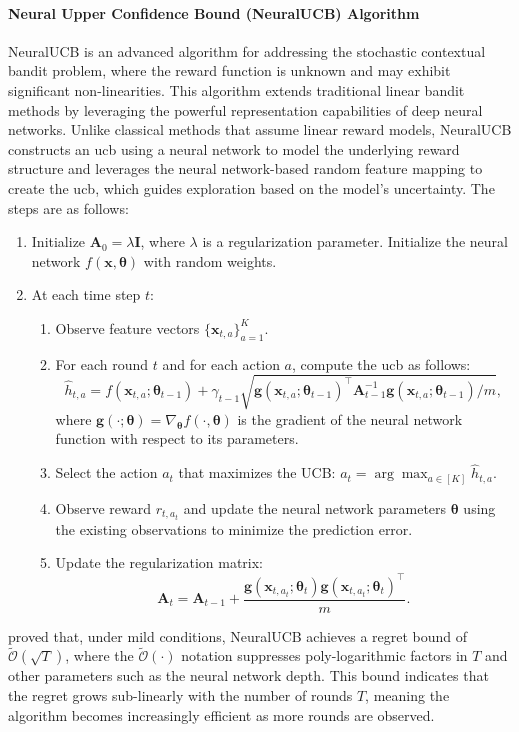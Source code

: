 \paragraph{Neural Upper Confidence Bound (NeuralUCB) Algorithm}
NeuralUCB \citep{zhou2020neural} is an advanced algorithm for addressing the stochastic contextual bandit problem, where the reward function is unknown and may exhibit significant non-linearities. This algorithm extends traditional linear bandit methods by leveraging the powerful representation capabilities of deep neural networks. Unlike classical methods that assume linear reward models, NeuralUCB constructs an \acf{ucb} using a neural network to model the underlying reward structure and leverages the neural network-based random feature mapping to create the \ac{ucb}, which guides exploration based on the model's uncertainty. The steps are as follows:
\begin{enumerate}
    \item Initialize $\mathbf{A}_0 = \lambda \mathbf{I}$, where $\lambda$ is a regularization parameter. Initialize the neural network $f (\mathbf{x}, \boldsymbol{\theta})$ with random weights. 
    \item At each time step $t$:
    \begin{enumerate}
        \item Observe feature vectors $\{\mathbf{x}_{t,a}\}_{a=1}^K$.
        \item For each round \( t \) and for each action \( a \), compute the \ac{ucb} as follows:
        \[
        \hat{h}_{t,a} = f(\mathbf{x}_{t,a}; \boldsymbol{\theta}_{t-1}) + \gamma_{t-1} \sqrt{\mathbf{g}(\mathbf{x}_{t,a}; \boldsymbol{\theta}_{t-1})^\top \mathbf{A}_{t-1}^{-1} \mathbf{g}(\mathbf{x}_{t,a}; \boldsymbol{\theta}_{t-1}) / m}, 
        \]
        where $\mathbf{g}(\cdot; \boldsymbol{\theta}) = \nabla_{\boldsymbol{\theta}} f(\cdot, \boldsymbol{\theta})$ is the gradient of the neural network function with respect to its parameters.  
        \item Select the action \( a_t \) that maximizes the UCB: $ a_t = \arg\max_{a \in [K]} \hat{h}_{t,a}.$
        \item Observe reward $r_{t, a_t}$ and update the neural network parameters $\boldsymbol{\theta}$ using the existing observations to minimize the prediction error.
        \item Update the regularization matrix:
            \[
            \mathbf{A}_t = \mathbf{A}_{t-1} + \frac{\mathbf{g}(\mathbf{x}_{t,a_t}; \boldsymbol{\theta}_t) \mathbf{g}(\mathbf{x}_{t,a_t}; \boldsymbol{\theta}_t)^\top}{m}.
            \]
    \end{enumerate}
\end{enumerate}
\citet{zhou2020neural} proved that, under mild conditions, NeuralUCB achieves a regret bound of $\widetilde{\mathcal{O}}(\sqrt{T})$, where the $\widetilde{\mathcal{O}}(\cdot)$ notation suppresses poly-logarithmic factors in $T$ and other parameters such as the neural network depth. This bound indicates that the regret grows sub-linearly with the number of rounds $T$, meaning the algorithm becomes increasingly efficient as more rounds are observed.

